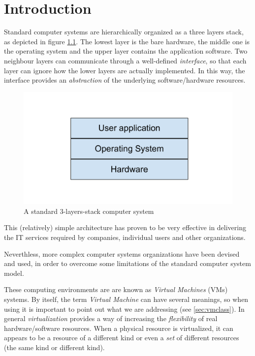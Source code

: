 \chapter{Introduction}

Standard computer systems are hierarchically organized as a three
layers stack, as depicted in figure \ref{fig:3ls}. The lowest layer is the bare hardware, the middle one is the operating system and the 
upper layer contains the application software.
Two neighbour layers can communicate through a well-defined \emph{interface}, so that each layer can ignore how the
lower layers are actually implemented. In this way, the interface provides an \emph{abstraction} of the underlying software/hardware
resources.

\begin{figure}[bt]
\centering
\includegraphics[scale = 0.45]{3-layers-stack.pdf}
\caption{A standard 3-layers-stack computer system}
\label{fig:3ls}
\end{figure}

This (relatively) simple architecture has proven to be very effective in delivering the IT services required
by companies, individual users and other organizations.

\vspace{0.5cm}

Neverthless, more complex computer systems organizations have been devised and used, in order to overcome some limitations
of the standard computer system model.

These computing environments are are known as \emph{Virtual Machines} (VMs) systems.
By itself, the term \emph{Virtual Machine} can have several meanings, so when using it is important to point out what we are
addressing (see \ref{sec:vmclass}).
In general \emph{virtualization} provides a way of increasing the \emph{flexibility} of real hardware/software resources. When a 
physical resource is virtualized, it can appears to be a resource of a different kind or even a \emph{set} of different
resources (the same kind or different kind).

